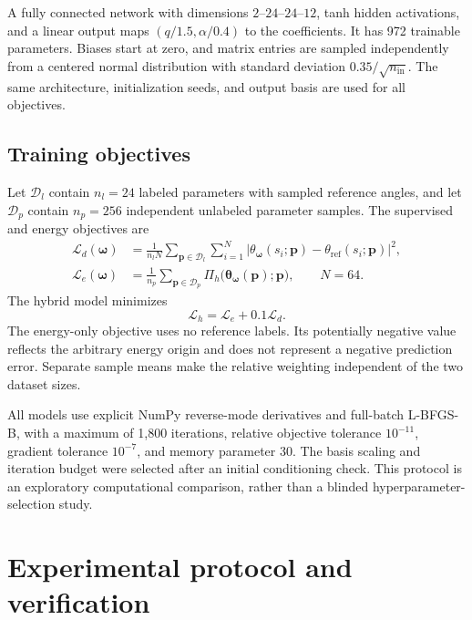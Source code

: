 \documentclass[11pt,a4paper]{article}
\begin{document}
A fully connected network with dimensions $2$--$24$--$24$--$12$, tanh hidden activations, and a linear output maps $(q/1.5,\alpha/0.4)$ to the coefficients. It has 972 trainable parameters. Biases start at zero, and matrix entries are sampled independently from a centered normal distribution with standard deviation $0.35/\sqrt{n_{\mathrm{in}}}$. The same architecture, initialization seeds, and output basis are used for all objectives.

\subsection{Training objectives}
Let $\mathcal D_l$ contain $n_l=24$ labeled parameters with sampled reference angles, and let $\mathcal D_p$ contain $n_p=256$ independent unlabeled parameter samples. The supervised and energy objectives are
\begin{align}
 \mathcal L_d(\boldsymbol\omega)
 &=\frac{1}{n_lN}\sum_{\mathbf p\in\mathcal D_l}\sum_{i=1}^{N}
 \left|\theta_{\boldsymbol\omega}(s_i;\mathbf p)-\theta_{\mathrm{ref}}(s_i;\mathbf p)\right|^2,
 \label{eq:dataloss}\\
 \mathcal L_e(\boldsymbol\omega)
 &=\frac{1}{n_p}\sum_{\mathbf p\in\mathcal D_p}
 \Pi_h\big(\boldsymbol\theta_{\boldsymbol\omega}(\mathbf p);\mathbf p\big),\qquad N=64.
 \label{eq:energyloss}
\end{align}
The hybrid model minimizes
\begin{equation}
 \mathcal L_h=\mathcal L_e+0.1\mathcal L_d.
 \label{eq:hybridloss}
\end{equation}
The energy-only objective uses no reference labels. Its potentially negative value reflects the arbitrary energy origin and does not represent a negative prediction error. Separate sample means make the relative weighting independent of the two dataset sizes.

All models use explicit NumPy reverse-mode derivatives and full-batch L-BFGS-B, with a maximum of 1,800 iterations, relative objective tolerance $10^{-11}$, gradient tolerance $10^{-7}$, and memory parameter 30. The basis scaling and iteration budget were selected after an initial conditioning check. This protocol is an exploratory computational comparison, rather than a blinded hyperparameter-selection study.

\section{Experimental protocol and verification}
\end{document}
